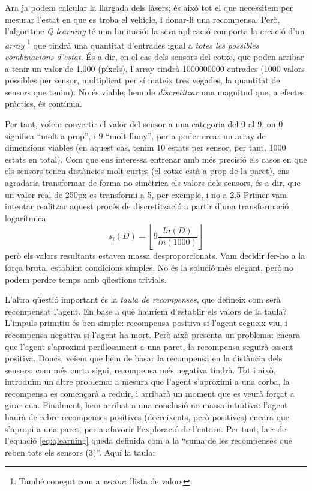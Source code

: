Ara ja podem calcular la llargada dels làsers; és això tot el que necessitem per mesurar l'estat
en que es troba el vehicle, i donar-li una recompensa. Però, l'algoritme \emph{Q-learning} té una limitació: la seva aplicació
comporta la creació d'un \emph{array} \footnote{També conegut com a \emph{vector}: llista de valors}
que tindrà una quantitat d'entrades igual a \emph{totes les possibles combinacions d'estat}. És a dir,
en el cas dels sensors del cotxe, que poden arribar a tenir un valor de 1,000 (píxels), l'array
tindrà \num{1000000000} entrades (1000 valors possibles per sensor, multiplicat per sí mateix tres vegades, la quantitat
de sensors que tenim). No és viable; hem de \emph{discretitzar} una magnitud que, a efectes pràctics, és contínua.

Per tant, volem convertir el valor del sensor a una categoria del 0 al 9, on 0 significa ``molt a prop'', i 9 ``molt lluny'',
per a poder crear un array de dimensions viables (en aquest cas, tenim 10 estats per sensor, per tant, 1000 estats en total).
Com que ens interessa entrenar amb més precisió els casos en que els sensors tenen distàncies molt curtes (el cotxe està a 
prop de la paret), ens agradaria transformar de forma no simètrica els valors dels sensors, és a dir, que un valor real de
250px es transformi a 5, per exemple, i no a 2.5
Primer vam intentar realitzar aquest procés de discretització a partir d'una transformació logarítmica:
\begin{equation}
s_i(D) = \left\lfloor 9 \frac{ln(D)}{ln(1000)} \right\rfloor
\end{equation}
però els valors resultants estaven massa desproporcionats. Vam decidir fer-ho a la força bruta, establint condicions
simples. No és la solució més elegant, però no podem perdre temps amb qüestions trivials.

L'altra qüestió important és la \emph{taula de recompenses}, que defineix com serà recompensat l'agent. En base a què
hauríem d'establir els valors de la taula? L'impuls primitiu és ben simple: recompensa positiva si l'agent segueix viu,
i recompensa negativa si l'agent ha mort. Però això presenta un problema: encara que l'agent s'aproximi perillosament 
a una paret, la recompensa seguirà essent positiva. Doncs, veiem que hem de basar la recompensa en la distància dels sensors:
com més curta sigui, recompensa més negativa tindrà. Tot i això, introduïm un altre problema: a mesura que l'agent s'aproximi a una
corba, la recompensa es començarà a reduir, i arribarà un moment que es veurà forçat a girar cua. Finalment, hem arribat a una conclusió
no massa intuïtiva: l'agent haurà de rebre recompenses positives (decreixents, però positives) encara que s'apropi a una paret, per a
afavorir l'exploració de l'entorn. Per tant, la \(r\) de l'equació \ref{eq:qlearning} queda definida
com a la ``suma de les recompenses que reben tots els sensors (3)''. Aquí la taula:

